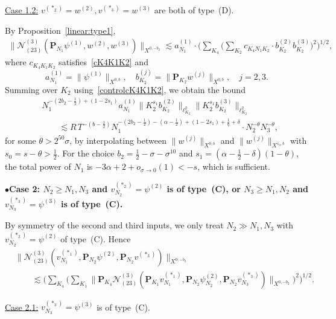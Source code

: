 \documentclass[11pt,reqno,english]{amsart}
\numberwithin{equation}{section}
\theoremstyle{plain}
\theoremstyle{definition}
\theoremstyle{remark}
\newcommand{\noi}{\noindent}
\begin{document}
\medskip

\underline{Case 1.2:}
$v^{(\ast_2)}=w^{(2)},v^{(\ast_3)}=w^{(3)}$ are both of type~(D).

By Proposition~\ref{linear:type1},
\begin{align*}
	\|\mathcal{N}_{(23)}^{(3)}(\mathbf{P}_{N_1}\psi^{(1)}, w^{(2)},w^{(3)})\|_{X^{0,-b_2}}\lesssim a_{N_1}^{(1)}\cdot \Big(
	\sum_{K_4}
	\Big(
	\sum_{K_2} c_{K_4 N_1 K_2}\cdot b_{K_2}^{(2)}b_{K_2}^{(3)}
	\Big)^2
	\Big)^{1/2},
\end{align*}
where $c_{K_4 K_1 K_2}$ satisfies~\eqref{cK4K1K2} and
\[
a_{N_1}^{(1)}=\|\psi^{(1)}\|_{X^{0,b}},\quad b_{K_2}^{(j)}=\|\mathbf{P}_{K_2}w^{(j)}\|_{X^{0,b}},\quad j=2,3.
\]
Summing over $K_2$ using~\eqref{controlcK4K1K2}, we obtain the bound
\begin{align*}
	&N_1^{-(2b_2-\frac{1}{2})+(1-2s_1)}a_{N_1}^{(1)}\|K_2^{s_1}b_{K_2}^{(2)}\|_{\ell_{K_2}^2}\|K_2^{s_1}b_{K_2}^{(3)}\|_{\ell_{K_2}^2}\\
	&\qquad\lesssim R\, T^{-(b-\frac{1}{2})}N_1^{-(2b_2-\frac{1}{2})-(\alpha-\frac{1}{2})+(1-2s_1)+\frac{1}{q}+\delta}\cdot N_2^{-\theta}N_3^{-\theta},
\end{align*}
for some $\theta>2^{50}\sigma$, by interpolating between $\|w^{(j)}\|_{X^{0,b}}$ and $\|w^{(j)}\|_{X^{s_0,b}}$ with $s_0=s-\theta>\frac{1}{2}$. For the choice $b_2=\frac{1}{2}-\sigma-\sigma^{10}$ and $s_1=(\alpha-\frac{1}{2}-\delta)(1-\theta)$, the total power of $N_1$ is $-3\alpha+2+o_{\sigma\to 0}(1)<-s$, which is sufficient.

\medskip


\noi
$\bullet${\bf Case 2: $N_2\geq N_1, N_3$ and $v_{N_2}^{(\ast_2)}=\psi^{(2)}$ is of type~(C), or $N_3\geq N_1, N_2$ and $v_{N_3}^{(\ast_3)}=\psi^{(3)}$ is of type~(C).}

By symmetry of the second and third inputs, we only treat $N_2\gg N_1, N_3$ with $v_{N_2}^{(\ast_2)}=\psi^{(2)}$ of type~(C). Hence
\begin{align*}
	&\|\mathcal{N}_{(23)}^{(3)}(v_{N_1}^{(\ast_1)},\mathbf{P}_{N_2}\psi^{(2)},\mathbf{P}_{N_2}v^{(\ast_3)})\|_{X^{0,-b_2}}\\ &\qquad\lesssim \Big(
	\sum_{K_4}\Big(\sum_{
		K_1
	}
	\|\mathbf{P}_{K_4}\mathcal{N}_{(23)}^{(3)}(\mathbf{P}_{K_1}v_{N_1}^{(\ast_1)},\mathbf{P}_{N_2}\psi_{N_2}^{(2)},\mathbf{P}_{N_2}v_{N_3}^{(\ast_3)})\|_{X^{0,-b_2}}
	\Big)^2
	\Big)^{1/2}.
\end{align*}

\underline{Case 2.1:} $v_{N_3}^{(\ast_3)}=\psi^{(3)}$ is of type~(C).
\end{document}

